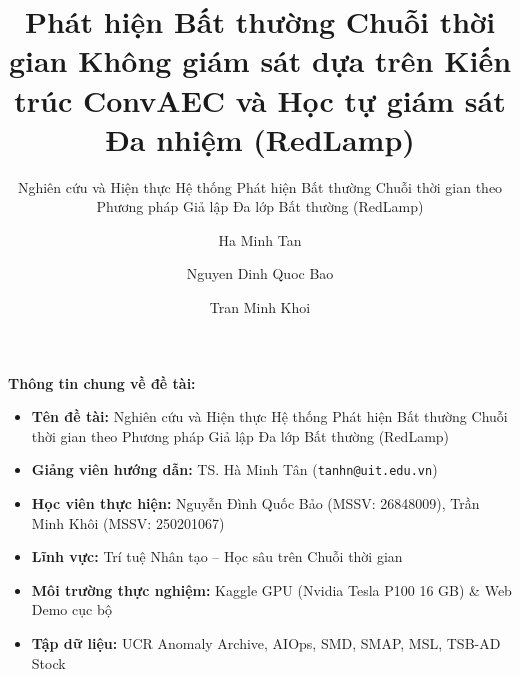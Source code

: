 \documentclass[sigconf,nonacm]{acmart}
\begin{document}

\title[Phát hiện Bất thường Chuỗi thời gian Không giám sát dựa trên ConvAEC và RedLamp]{Phát hiện Bất thường Chuỗi thời gian Không giám sát dựa trên Kiến trúc ConvAEC và Học tự giám sát Đa nhiệm (RedLamp)}
\subtitle{Nghiên cứu và Hiện thực Hệ thống Phát hiện Bất thường Chuỗi thời gian theo Phương pháp Giả lập Đa lớp Bất thường (RedLamp)}

\author{Ha Minh Tan}

\author{Nguyen Dinh Quoc Bao}

\author{Tran Minh Khoi}


\maketitle
\thispagestyle{empty} %

\noindent\textbf{Thông tin chung về đề tài:}
\begin{itemize}[leftmargin=*, itemsep=1pt, parsep=0pt]
    \item \textbf{Tên đề tài:} Nghiên cứu và Hiện thực Hệ thống Phát hiện Bất thường Chuỗi thời gian theo Phương pháp Giả lập Đa lớp Bất thường (RedLamp)
    \item \textbf{Giảng viên hướng dẫn:} TS. Hà Minh Tân (\texttt{tanhn@uit.edu.vn})
    \item \textbf{Học viên thực hiện:} Nguyễn Đình Quốc Bảo (MSSV: 26848009), Trần Minh Khôi (MSSV: 250201067)
    \item \textbf{Lĩnh vực:} Trí tuệ Nhân tạo -- Học sâu trên Chuỗi thời gian
    \item \textbf{Môi trường thực nghiệm:} Kaggle GPU (Nvidia Tesla P100 16 GB) \& Web Demo cục bộ
    \item \textbf{Tập dữ liệu:} UCR Anomaly Archive, AIOps, SMD, SMAP, MSL, TSB-AD Stock
\end{itemize}
\end{document}
